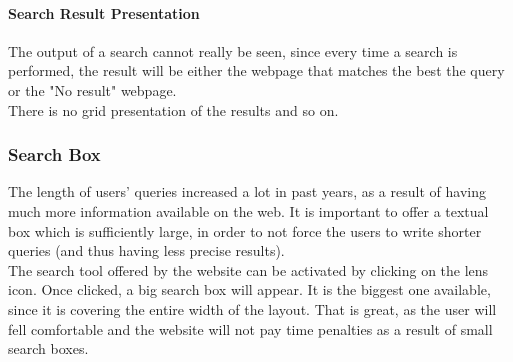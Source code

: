 \paragraph{Search Result Presentation}
The output of a search cannot really be seen, since every time a search is performed, the result will be either the webpage that matches the best the query or the "No result" webpage.\\
There is no grid presentation of the results and so on.

\subsubsection{Search Box}
The length of users' queries increased a lot in past years, as a result of having much more information available on the web. It is important to offer a textual box which is sufficiently large, in order to not force the users to write shorter queries (and thus having less precise results).\\

The search tool offered by the website can be activated by clicking on the lens icon. Once clicked, a big search box will appear. It is the biggest one available, since it is covering the entire width of the layout. That is great, as the user will fell comfortable and the website will not pay time penalties as a result of small search boxes.